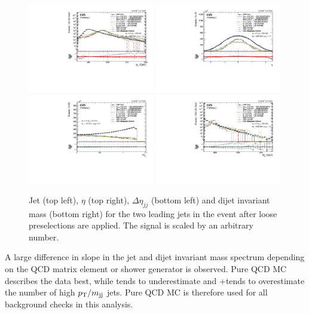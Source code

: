 \begin{figure}[h!]
\centering
\includegraphics[width=0.49\textwidth]{figures/analysis/search2/AN-16-235/plots/qcdcp_Pt.pdf}
\includegraphics[width=0.49\textwidth]{figures/analysis/search2/AN-16-235/plots/qcdcp_Eta.pdf}\\
\includegraphics[width=0.49\textwidth]{figures/analysis/search2/AN-16-235/plots/qcdcp_DeltaEta.pdf}
\includegraphics[width=0.49\textwidth]{figures/analysis/search2/AN-16-235/plots/qcdcp_Mjj.pdf}
\caption{Jet \PT{} (top left), $\eta$ (top right), $\Delta \eta_{jj}$ (bottom left) and dijet invariant mass (bottom right) for the two leading jets in the event after loose preselections are applied. The signal is scaled by an arbitrary number.}
\label{fig:searchII:kinematics-all}
\end{figure}
A large difference in slope in the jet \PT and dijet invariant mass spectrum depending on the QCD matrix element or shower generator is observed. Pure \PYTHIA QCD MC describes the data best, while \HERWIG{++} tends to underestimate and \amcatnlo{}+\PYTHIA tends to overestimate the number of high $p_{\mathrm{T}}/m_\mathrm{jj}$ jets. Pure  QCD MC is therefore used for all background checks in this analysis.

